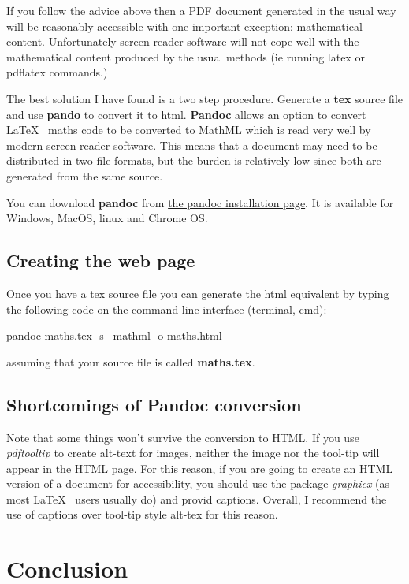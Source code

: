 \documentclass[]{article}
\begin{document}
If you follow the advice above then a PDF document generated in the
usual way will be reasonably accessible with one important exception:
mathematical content. Unfortunately screen reader software will not cope
well with the mathematical content produced by the usual methods (ie
running latex or pdflatex commands.)

The best solution I have found is a two step procedure. Generate a
\textbf{tex} source file and use \textbf{pando} to convert it to html.
\textbf{Pandoc} allows an option to convert \LaTeX~ maths code to be
converted to MathML which is read very well by modern screen reader
software. This means that a document may need to be distributed in two
file formats, but the burden is relatively low since both are generated
from the same source.

You can download \textbf{pandoc} from
\href{https://pandoc.org/installing.html}{the pandoc installation page}.
It is available for Windows, MacOS, linux and Chrome OS.

\hypertarget{creating-the-web-page}{%
\subsection{Creating the web page}\label{creating-the-web-page}}

Once you have a tex source file you can generate the html equivalent by
typing the following code on the command line interface (terminal, cmd):

pandoc maths.tex -s --mathml -o maths.html

assuming that your source file is called \textbf{maths.tex}.

\subsection{Shortcomings of Pandoc conversion}

Note that some things won't survive the conversion to HTML.  If you use
\emph{pdftooltip} to create alt-text for images, neither the image nor the tool-tip will appear in the 
HTML page.  For this reason, if you are going to create an HTML version of a document for accessibility, you 
should use the package \emph{graphicx} (as most \LaTeX~ users usually do) and provid captions.  Overall, 
I recommend the use of captions over tool-tip style alt-tex for this reason.

\hypertarget{conclusion}{%
\section{Conclusion}\label{conclusion}}
\end{document}

